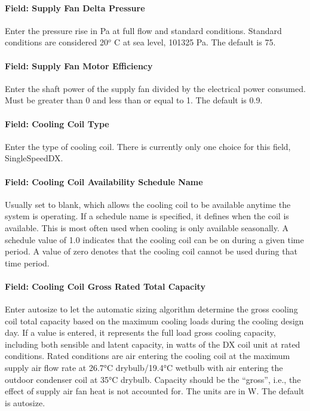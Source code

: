 \paragraph{Field: Supply Fan Delta Pressure}\label{field-supply-fan-delta-pressure-1}

Enter the pressure rise in Pa at full flow and standard conditions. Standard conditions are considered 20\(^{o}\) C at sea level, 101325 Pa. The default is 75.

\paragraph{Field: Supply Fan Motor Efficiency}\label{field-supply-fan-motor-efficiency-2}

Enter the shaft power of the supply fan divided by the electrical power consumed. Must be greater than 0 and less than or equal to 1. The default is 0.9.

\paragraph{Field: Cooling Coil Type}\label{field-cooling-coil-type-2}

Enter the type of cooling coil. There is currently only one choice for this field, SingleSpeedDX.

\paragraph{Field: Cooling Coil Availability Schedule Name}\label{field-cooling-coil-availability-schedule-name-2}

Usually set to blank, which allows the cooling coil to be available anytime the system is operating. If a schedule name is specified, it defines when the coil is available. This is most often used when cooling is only available seasonally. A schedule value of 1.0 indicates that the cooling coil can be on during a given time period. A value of zero denotes that the cooling coil cannot be used during that time period.

\paragraph{Field: Cooling Coil Gross Rated Total Capacity}\label{field-cooling-coil-gross-rated-total-capacity-1}

Enter autosize to let the automatic sizing algorithm determine the gross cooling coil total capacity based on the maximum cooling loads during the cooling design day. If a value is entered, it represents the full load gross cooling capacity, including both sensible and latent capacity, in watts of the DX coil unit at rated conditions. Rated conditions are air entering the cooling coil at the maximum supply air flow rate at 26.7°C drybulb/19.4°C wetbulb with air entering the outdoor condenser coil at 35°C drybulb. Capacity should be the ``gross'', i.e., the effect of supply air fan heat is not accounted for. The units are in W. The default is autosize.

